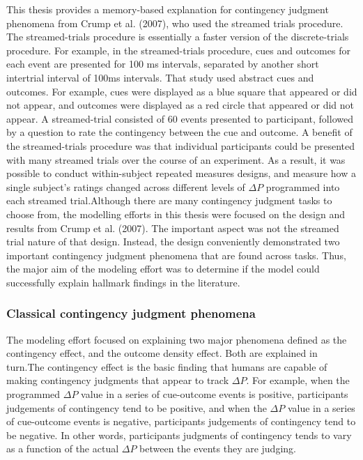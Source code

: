 \documentclass[
  english,
  man,floatsintext]{apa6}
\begin{document}
This thesis provides a memory-based explanation for contingency judgment phenomena from Crump et al. (2007), who used the streamed trials procedure. The streamed-trials procedure is essentially a faster version of the discrete-trials procedure. For example, in the streamed-trials procedure, cues and outcomes for each event are presented for 100 ms intervals, separated by another short intertrial interval of 100ms intervals. That study used abstract cues and outcomes. For example, cues were displayed as a blue square that appeared or did not appear, and outcomes were displayed as a red circle that appeared or did not appear. A streamed-trial consisted of 60 events presented to participant, followed by a question to rate the contingency between the cue and outcome. A benefit of the streamed-trials procedure was that individual participants could be presented with many streamed trials over the course of an experiment. As a result, it was possible to conduct within-subject repeated measures designs, and measure how a single subject's ratings changed across different levels of \(\Delta P\) programmed into each streamed trial.Although there are many contingency judgment tasks to choose from, the modelling efforts in this thesis were focused on the design and results from Crump et al. (2007). The important aspect was not the streamed trial nature of that design. Instead, the design conveniently demonstrated two important contingency judgment phenomena that are found across tasks. Thus, the major aim of the modeling effort was to determine if the model could successfully explain hallmark findings in the literature.

\hypertarget{classical-contingency-judgment-phenomena}{%
\subsubsection{Classical contingency judgment phenomena}\label{classical-contingency-judgment-phenomena}}

The modeling effort focused on explaining two major phenomena defined as the contingency effect, and the outcome density effect. Both are explained in turn.The contingency effect is the basic finding that humans are capable of making contingency judgments that appear to track \(\Delta P\). For example, when the programmed \(\Delta P\) value in a series of cue-outcome events is positive, participants judgements of contingency tend to be positive, and when the \(\Delta P\) value in a series of cue-outcome events is negative, participants judgements of contingency tend to be negative. In other words, participants judgments of contingency tends to vary as a function of the actual \(\Delta P\) between the events they are judging.
\end{document}

